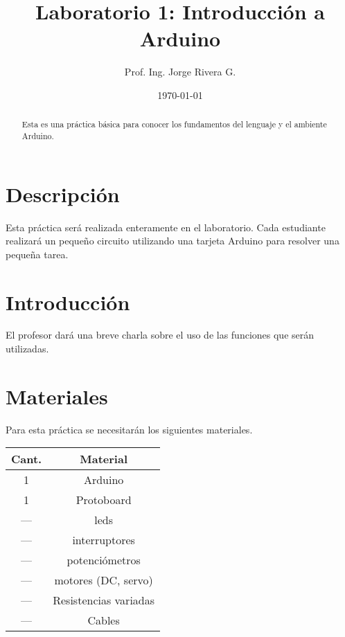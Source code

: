 \documentclass[12pt,letterpaper]{IEEEtran}
\title{Laboratorio 1: Introducción a Arduino}
\author{Prof. Ing. Jorge Rivera G.}
\date{\today}
\begin{document}

\renewcommand{\leftmark}{UNIVERSIDAD LATINA DE COSTA RICA -- IEC-650 LABORATORIO DE SISTEMAS DIGITALES}

\maketitle


\begin{abstract}
Esta es una práctica básica para conocer los fundamentos del lenguaje y el ambiente Arduino. 
\end{abstract}
\section{Descripción}

Esta práctica será realizada enteramente en el laboratorio. Cada estudiante realizará un pequeño circuito utilizando una tarjeta Arduino para resolver una pequeña tarea.


\section{Introducción}

El profesor dará una breve charla sobre el uso de las funciones que serán utilizadas.

\section{Materiales}

Para esta práctica se necesitarán los siguientes materiales.

\begin{center}
\begin{tabular}{c|c}\hline
	Cant. & \hspace{2cm}Material\hspace{2cm} \\\hline\hline
	1 	& Arduino 		\\\hline
	1	& Protoboard 	\\\hline	
	---	& leds			\\\hline
	--- & interruptores		\\\hline
	--- & potenciómetros	\\\hline
	--- & motores (DC, servo) \\\hline
	---	& Resistencias variadas \\\hline
	--- & Cables		\\\hline
\end{tabular}
\end{center}
\end{document}
